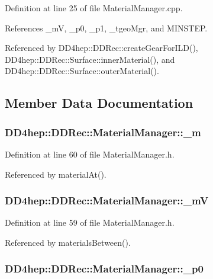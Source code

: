 Definition at line 25 of file MaterialManager.cpp.

References \_\-mV, \_\-p0, \_\-p1, \_\-tgeoMgr, and MINSTEP.

Referenced by DD4hep::DDRec::createGearForILD(), DD4hep::DDRec::Surface::innerMaterial(), and DD4hep::DDRec::Surface::outerMaterial().

\subsection{Member Data Documentation}
\hypertarget{class_d_d4hep_1_1_d_d_rec_1_1_material_manager_a9959722f6a2058c3058c1bc06660f8f1}{
\subsubsection[{\_\-m}]{ {\bf DD4hep::DDRec::MaterialManager::\_\-m}}}
\label{class_d_d4hep_1_1_d_d_rec_1_1_material_manager_a9959722f6a2058c3058c1bc06660f8f1}


Definition at line 60 of file MaterialManager.h.

Referenced by materialAt().\hypertarget{class_d_d4hep_1_1_d_d_rec_1_1_material_manager_ad0ce589d4286c2392a208ec8a09455e4}{
\subsubsection[{\_\-mV}]{ {\bf DD4hep::DDRec::MaterialManager::\_\-mV}}}
\label{class_d_d4hep_1_1_d_d_rec_1_1_material_manager_ad0ce589d4286c2392a208ec8a09455e4}


Definition at line 59 of file MaterialManager.h.

Referenced by materialsBetween().\hypertarget{class_d_d4hep_1_1_d_d_rec_1_1_material_manager_a0d1a1b73cd506aa5a530dc90cf1bd88c}{
\subsubsection[{\_\-p0}]{ {\bf DD4hep::DDRec::MaterialManager::\_\-p0}}}
\label{class_d_d4hep_1_1_d_d_rec_1_1_material_manager_a0d1a1b73cd506aa5a530dc90cf1bd88c}


